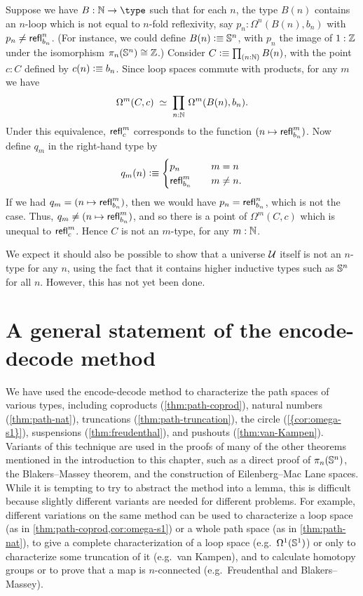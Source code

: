 \begin{eg}
  Suppose we have $B:\nat\to\type$ such that for each $n$, the type $B(n)$ contains an $n$-loop which is not equal to $n$-fold reflexivity, say $p_n:\Omega^n(B(n),b_n)$ with $p_n \neq \mathsf{refl}_{b_n}^n$.
  (For instance, we could define $B(n)\vcentcolon\equiv \mathbb{S}^n$, with $p_n$ the image of $1:\mathbb{Z}$ under the isomorphism $\pi_n(\mathbb{S}^n)\cong \mathbb{Z}$.)
  Consider $C\defeq \prd{n:\nat} B(n)$, with the point $c:C$ defined by $c(n)\vcentcolon\equiv b_n$.
  Since loop spaces commute with products, for any $m$ we have
  \[\eqvspaced{\Omega^m (C,c)}{\prd{n:\nat}\Omega^m(B(n),b_n)}.\]
  Under this equivalence, $\mathsf{refl}_{c}^m$ corresponds to the function $(n\mapsto \mathsf{refl}_{b_n}^m)$.
  Now define $q_m$ in the right-hand type by
  \[ q_m(n) \vcentcolon\equiv
  \begin{cases}
    p_n &\quad m=n\\
    \mathsf{refl}_{b_n}^m &\quad m\neq n.
  \end{cases}
  \]
  If we had $q_m = (n\mapsto \mathsf{refl}_{b_n}^m)$, then we would have $p_n = \mathsf{refl}_{b_n}^n$, which is not the case.
  Thus, $q_m \neq (n\mapsto \mathsf{refl}_{b_n}^m)$, and so there is a point of $\Omega^m(C,c)$ which is unequal to $\mathsf{refl}_{c}^m$.
  Hence $C$ is not an $m$-type, for any $m:\mathbb{N}$.
\end{eg}

We expect it should also be possible to show that a universe $\mathcal{U}$ itself is not an $n$-type for any $n$, using the fact that it contains higher inductive types such as $\mathbb{S}^n$ for all $n$.
However, this has not yet been done.

\section{A general statement of the encode-decode method}
\label{sec:general-encode-decode}


We have used the encode-decode method to characterize the path spaces
of various types, including coproducts (\cref{thm:path-coprod}), natural
numbers (\cref{thm:path-nat}), truncations (\cref{thm:path-truncation}),
the circle (\cref{{cor:omega-s1}}), suspensions (\cref{thm:freudenthal}), and pushouts
(\cref{thm:van-Kampen}).  Variants of this technique are used in the
proofs of many of the other theorems mentioned in the introduction to
this chapter, such as a direct proof of $\pi_n(\mathbb{S}^n)$, the Blakers--Massey theorem, and the construction of Eilenberg--Mac Lane spaces.
While it is tempting to try to
abstract the method into a lemma, this is difficult because
slightly different variants are needed for different problems.  For
example, different variations on the same method  can be used to
characterize a loop space (as in \cref{thm:path-coprod,cor:omega-s1}) or
a whole path space (as in \cref{thm:path-nat}), to give a complete
characterization of a loop space (e.g.\ $\Omega^1(\mathbb{S} ^1)$) or only to
characterize some truncation of it (e.g.\ van Kampen), and to calculate
homotopy groups or to prove that a map is $n$-connected (e.g.\ Freudenthal and
Blakers--Massey).

